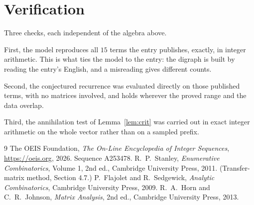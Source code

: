 \documentclass[11pt,a4paper]{article}
\theoremstyle{plain}
\theoremstyle{definition}
\begin{document}
\section{Verification}

Three checks, each independent of the algebra above.

First, the model reproduces all $15$ terms the entry publishes, exactly, in integer
arithmetic. This is what ties the model to the entry: the digraph is built by reading the
entry's English, and a misreading gives different counts.

Second, the conjectured recurrence was evaluated directly on those published terms, with no
matrices involved, and holds wherever the proved range and the data overlap.

Third, the annihilation test of Lemma~\ref{lem:crit} was carried out in exact integer
arithmetic on the whole vector rather than on a sampled prefix.

\begin{thebibliography}{9}
 The OEIS Foundation, \emph{The On-Line Encyclopedia of Integer
Sequences}, \url{https://oeis.org}, 2026. Sequence A253478.
 R.~P.~Stanley, \emph{Enumerative Combinatorics}, Volume 1, 2nd ed.,
Cambridge University Press, 2011. (Transfer-matrix method, Section 4.7.)
 P.~Flajolet and R.~Sedgewick, \emph{Analytic Combinatorics}, Cambridge
University Press, 2009.
 R.~A.~Horn and C.~R.~Johnson, \emph{Matrix Analysis}, 2nd ed., Cambridge
University Press, 2013.
\end{thebibliography}
\end{document}
